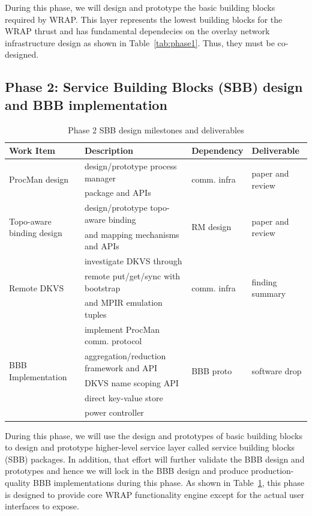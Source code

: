 \documentclass[10pt]{article}
\begin{document}
During this phase, we will design and prototype the basic building blocks required 
by WRAP. This layer represents the lowest building blocks for the WRAP thrust and has fundamental
dependecies on the overlay network infrastructure design as shown in Table~\ref{tab:phase1}.
Thus, they must be co-designed.

\subsection{Phase 2: Service Building Blocks (SBB) design and BBB implementation} 
\begin{table}
\centering
\begin{tabular}{|l|l|l|l|}
\hline
Work Item & Description & Dependency & Deliverable \\
\hline
\multirow{2}{*}{ProcMan design} & design/prototype process manager & \multirow{2}{*}{comm. infra} & \multirow{2}{*}{paper and review} \\
& package and APIs & & \\ \hline
\multirow{2}{*}{Topo-aware binding design} & design/prototype topo-aware binding & \multirow{2}{*}{RM design} & \multirow{2}{*}{paper and review} \\
& and mapping mechanisms and APIs & & \\ \hline
\multirow{3}{*}{Remote DKVS} & investigate DKVS through & \multirow{3}{*}{comm. infra} & \multirow{3}{*}{finding summary} \\
& remote put/get/sync with bootstrap & & \\
& and MPIR emulation tuples & & \\ \hline 
\multirow{5}{*}{BBB Implementation} & implement ProcMan comm. protocol & \multirow{5}{*}{BBB proto} & \multirow{5}{*}{software drop} \\
& aggregation/reduction framework and API & & \\ 
& DKVS name scoping API & & \\ 
& direct key-value store & & \\ 
& power controller & & \\ \hline
\end{tabular}
\caption{Phase 2 SBB design milestones and deliverables}
\label{tab:phase2}
\end{table}

During this phase, we will use the design and prototypes of basic building blocks 
to design and prototype higher-level service layer called service building blocks (SBB) 
packages. In addition, that effort will further validate the BBB design and prototypes
and hence we will lock in the BBB design and produce production-quality BBB implementations
during this phase. 
As shown in Table~\ref{tab:phase2}, this phase is designed to provide core WRAP functionality
engine except for the actual user interfaces to expose.
\end{document}
